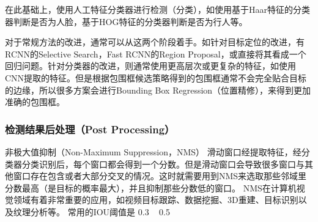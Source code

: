 \documentclass[a4paper, notitlepage]{article}
\begin{document}
在此基础上，使用人工特征分类器进行检测（分类），如使用基于Haar特征的分类器判断是否为人脸，基于HOG特征的分类器判断是否为行人等。

对于常规方法的改进，通常可以从这两个阶段着手。如针对目标定位的改进，有RCNN的Selective Search，Fast RCNN的Region Proposal，或直接将其看成一个回归问题。针对分类器的改进，则通常使用更高层次或更复杂的特征，如使用CNN提取的特征。但是根据包围框候选策略得到的包围框通常不会完全贴合目标的边缘，所以很多方案会进行Bounding Box Regression（位置精修），来得到更加准确的包围框。

\subsubsection{检测结果后处理（Post Processing）}
非极大值抑制（Non-Maximum Suppression，NMS） 滑动窗口经提取特征，经分类器分类识别后，每个窗口都会得到一个分数。但是滑动窗口会导致很多窗口与其他窗口存在包含或者大部分交叉的情况。这时就需要用到NMS来选取那些邻域里分数最高（是目标的概率最大），并且抑制那些分数低的窗口。 NMS在计算机视觉领域有着非常重要的应用，如视频目标跟踪、数据挖掘、3D重建、目标识别以及纹理分析等。 常用的IOU阈值是 0.3 ~ 0.5
\end{document}
